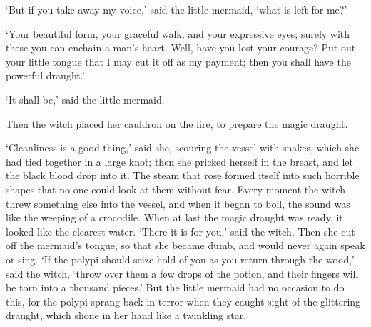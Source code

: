 `But if you take away my voice,' said the little mermaid, `what is left for me?'

`Your beautiful form, your graceful walk, and your expressive eyes; surely with these you can enchain a man’s heart.
Well, have you lost your courage? Put out your little tongue that I may cut it off as my payment; then you shall have the powerful draught.'

`It shall be,' said the little mermaid.

Then the witch placed her cauldron on the fire, to prepare the magic draught.

`Cleanliness is a good thing,' said she, scouring the vessel with snakes, which she had tied together in a large knot; then she pricked herself in the breast, and let the black blood drop into it.
The steam that rose formed itself into such horrible shapes that no one could look at them without fear.
Every moment the witch threw something else into the vessel, and when it began to boil, the sound was like the weeping of a crocodile.
When at last the magic draught was ready, it looked like the clearest water.
`There it is for you,' said the witch.
Then she cut off the mermaid’s tongue, so that she became dumb, and would never again speak or sing.
`If the polypi should seize hold of you as you return through the wood,' said the witch, `throw over them a few drops of the potion, and their fingers will be torn into a thousand pieces.' But the little mermaid had no occasion to do this, for the polypi sprang back in terror when they caught sight of the glittering draught, which shone in her hand like a twinkling star.

